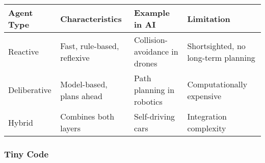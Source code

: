 \documentclass[
  letterpaper,
  DIV=11,
  numbers=noendperiod]{scrreprt}
\begin{document}
\begin{longtable}[]{@{}
  >{\raggedright\arraybackslash}p{}
  >{\raggedright\arraybackslash}p{}
  >{\raggedright\arraybackslash}p{}
  >{\raggedright\arraybackslash}p{}@{}}
\toprule\noalign{}
\begin{minipage}[b]{\linewidth}\raggedright
Agent Type
\end{minipage} & \begin{minipage}[b]{\linewidth}\raggedright
Characteristics
\end{minipage} & \begin{minipage}[b]{\linewidth}\raggedright
Example in AI
\end{minipage} & \begin{minipage}[b]{\linewidth}\raggedright
Limitation
\end{minipage} \\
\midrule\noalign{}
\endhead
\bottomrule\noalign{}
\endlastfoot
Reactive & Fast, rule-based, reflexive & Collision-avoidance in drones &
Shortsighted, no long-term planning \\
Deliberative & Model-based, plans ahead & Path planning in robotics &
Computationally expensive \\
Hybrid & Combines both layers & Self-driving cars & Integration
complexity \\
\end{longtable}

\subsubsection{Tiny Code}\label{tiny-code-6}
\end{document}
